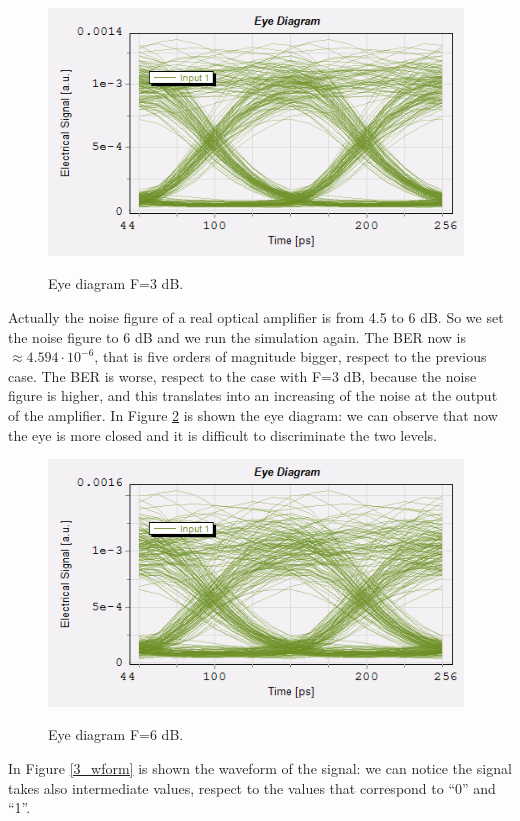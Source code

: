 \documentclass[a4paper,10pt]{report}
\begin{document}
\begin{figure}[!ht]
   \centering
   \includegraphics[width=11cm]{3_1.png}\\
   \caption{Eye diagram F=3 dB.}
   \label{3_1}
 \end{figure}

Actually the noise figure of a real optical amplifier is from 4.5 to 6 dB. So we set the noise figure to 6 dB and we run the simulation again.
The BER now is $\approx 4.594 \cdot 10^{-6}$, that is five orders of magnitude bigger, respect to the previous case.
The BER is worse, respect to the case with F=3 dB, because the noise figure is higher, and this translates into an increasing of the
noise at the output of the amplifier.
In Figure \ref{3_2} is shown the eye diagram: we can observe that now the eye is more closed and it is difficult to discriminate the two levels.

\begin{figure}[!ht]
   \centering
   \includegraphics[width=11cm]{3_2.png}\\
   \caption{Eye diagram F=6 dB.}
   \label{3_2}
 \end{figure}
 
 \newpage
 In Figure \ref{3_wform} is shown the waveform of the signal: we can notice the signal takes also intermediate values, respect to the values
 that correspond to ``0'' and ``1''.
 
\end{document}

